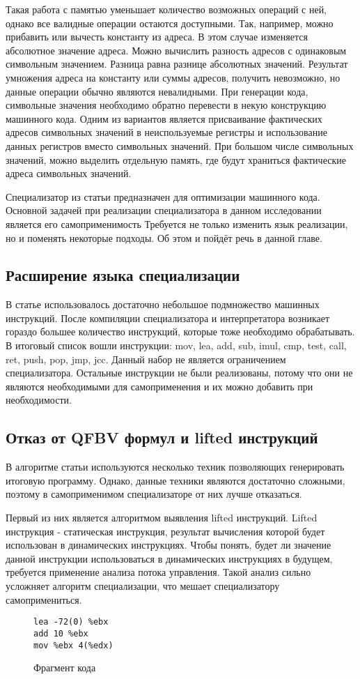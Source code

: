 Такая работа с памятью уменьшает количество возможных операций с ней, однако все валидные операции остаются доступными. Так, например, можно прибавить или вычесть константу из адреса. В этом случае изменяется абсолютное значение адреса. Можно вычислить разность адресов с одинаковым символьным значением. Разница равна разнице абсолютных значений. Результат умножения адреса на константу или суммы адресов, получить невозможно, но данные операции обычно являются невалидными. При генерации кода, символьные значения необходимо обратно перевести в некую конструкцию машинного кода. Одним из вариантов является присваивание фактических адресов символьных значений в неиспользуемые регистры и использование данных регистров вместо символьных значений. При большом числе символьных значений, можно выделить отдельную память, где будут храниться фактические адреса символьных значений.

Специализатор из статьи \cite{PEMC} предназначен для оптимизации машинного кода. Основной задачей при реализации специализатора в данном исследовании является его самоприменимость Требуется не только изменить язык реализации, но и поменять некоторые подходы. Об этом и пойдёт речь в данной главе.
\subsection{ Расширение языка специализации}
\label{part:4.4}
В статье \cite{PEMC} использовалось достаточно небольшое подмножество машинных инструкций. После компиляции специализатора и интерпретатора возникает гораздо большее количество инструкций, которые тоже необходимо обрабатывать. В итоговый список вошли инструкции: mov, lea, add, sub, imul, cmp, test, call, ret, push, pop, jmp, jcc. Данный набор не является ограничением специализатора. Остальные инструкции не были реализованы, потому что они не являются необходимыми для самоприменения и их можно добавить при необходимости.
\subsection{ Отказ от QFBV формул и lifted инструкций}
\label{part:4.5}

В алгоритме статьи \cite{PEMC} используются несколько техник позволяющих генерировать итоговую программу. Однако, данные техники являются достаточно сложными, поэтому в самоприменимом специализаторе от них лучше отказаться. 

Первый из них является алгоритмом выявления lifted инструкций. Lifted инструкция - статическая инструкция, результат вычисления которой будет использован в динамических инструкциях. Чтобы понять, будет ли значение данной инструкции использоваться в динамических инструкциях в будущем, требуется применение анализа потока управления. Такой анализ сильно усложняет алгоритм специализации, что мешает специализатору самопримениться. 
\begin{wrapfigure}{r}{0.4\textwidth}
\begin{lstlisting}[xleftmargin = 20pt]
lea -72(0) %ebx
add 10 %ebx
mov %ebx 4(%edx)
\end{lstlisting}
\caption{Фрагмент кода}
\label{fig:qfbv1}
\end{wrapfigure}

